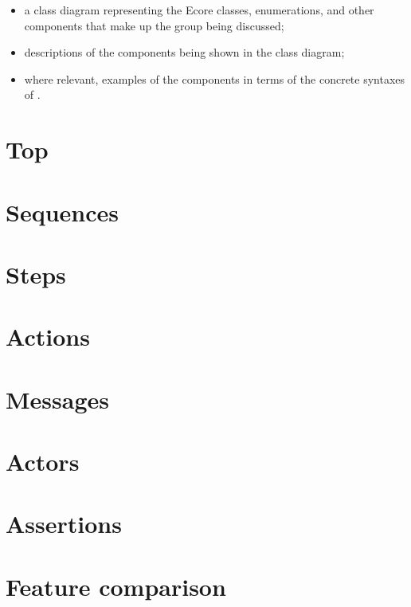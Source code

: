 \begin{itemize}
\item
	a class diagram representing the Ecore classes, enumerations, and other
	components that make up the group being discussed;
\item
	descriptions of the components being shown in the class diagram;
\item
	where relevant, examples of the components in terms of the concrete
	syntaxes of \langname.
\end{itemize}

\section{Top}\label{sec:metamodel-top}


\section{Sequences}\label{sec:metamodel-sequences}


\section{Steps}\label{sec:metamodel-steps}


\section{Actions}\label{sec:metamodel-actions}


\section{Messages}\label{sec:metamodel-messages}


\section{Actors}\label{sec:metamodel-actors}


\section{Assertions}\label{sec:metamodel-assertions}


\section{Feature comparison}\label{sec:metamodel-features}


